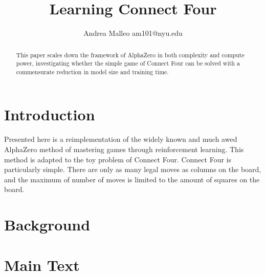 \documentclass[twoside,11pt]{article}
\begin{document}
\title{Learning Connect Four}

\author{\name Andrea Malleo \email am101@nyu.edu \\}


\begin{abstract}%
This paper scales down the framework of AlphaZero in both complexity and compute power,
investigating whether the simple game of Connect Four can be solved with a commensurate
reduction in model size and training time. 
\end{abstract}

  
 
\section{Introduction}
Presented here is a reimplementation of the widely known and much awed AlphaZero method of 
mastering games through reinforcement learning. This method is adapted to 
the toy problem of Connect Four. Connect Four is particularly simple. There are only
as many legal moves as columns on the board, and the maximum of number of moves 
is limited to the amount of squares on the board. 

\section{Background}




\section{Main Text}
\end{document}
